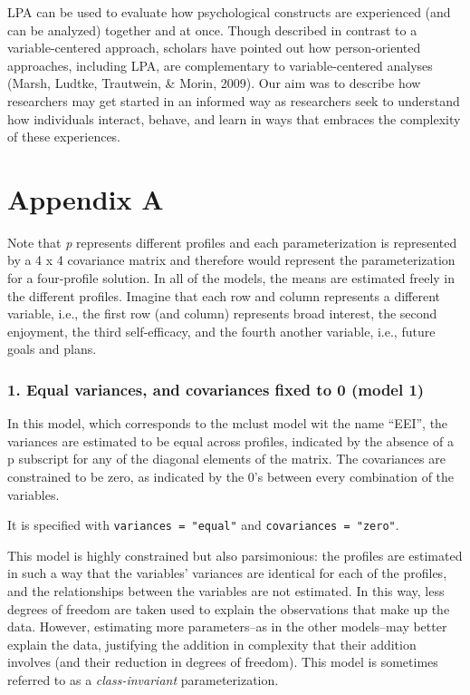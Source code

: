 \documentclass[man]{apa6}
\begin{document}
LPA can be used to evaluate how psychological constructs are experienced (and
can be analyzed) together and at once. Though described in contrast to a
variable-centered approach, scholars have pointed out how person-oriented
approaches, including LPA, are complementary to variable-centered analyses
(Marsh, Ludtke, Trautwein, \& Morin, 2009). Our aim was to describe how
researchers may get started in an informed way as researchers seek to understand
how individuals interact, behave, and learn in ways that embraces the complexity
of these experiences.

\hypertarget{appendix-a}{%
\section{Appendix A}\label{appendix-a}}

Note that \emph{p} represents different profiles and each parameterization is represented by a 4 x 4 covariance matrix and therefore would represent the parameterization for a four-profile solution. In all of the models, the means are estimated freely in the different profiles. Imagine that each row and column represents a different variable, i.e., the first row (and column) represents broad interest, the second enjoyment, the third self-efficacy, and the fourth another variable, i.e., future goals and plans.

\hypertarget{equal-variances-and-covariances-fixed-to-0-model-1}{%
\subsubsection{1. Equal variances, and covariances fixed to 0 (model 1)}\label{equal-variances-and-covariances-fixed-to-0-model-1}}

In this model, which corresponds to the mclust model wit the name \enquote{EEI}, the variances are estimated to be equal across profiles, indicated by the absence of a p subscript for any of the diagonal elements of the matrix. The covariances are constrained to be zero, as indicated by the 0's between every combination of the variables.

It is specified with \texttt{variances\ =\ "equal"} and \texttt{covariances\ =\ "zero"}.

This model is highly constrained but also parsimonious: the profiles are estimated in such a way that the variables' variances are identical for each of the profiles, and the relationships between the variables are not estimated. In this way, less degrees of freedom are taken used to explain the observations that make up the data. However, estimating more parameters--as in the other models--may better explain the data, justifying the addition in complexity that their addition involves (and their reduction in degrees of freedom). This model is sometimes referred to as a \emph{class-invariant} parameterization.
\end{document}
